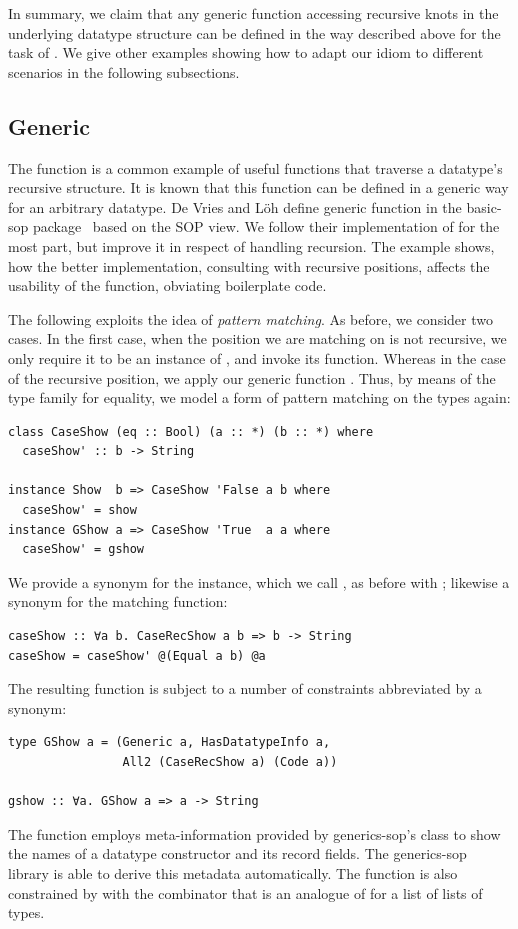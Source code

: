 \documentclass[sigplan,screen,review,anonymous]{acmart}
\begin{document}
In summary, we claim that any generic function accessing recursive knots in the underlying datatype structure can be defined in the way described above for the task of . We give other examples showing how to adapt our idiom to different scenarios in the following subsections.

\subsection{Generic }
\label{subsec:gshow}

The function  is a common example of useful functions that traverse a datatype's recursive structure. It is known that this function can be defined in a generic way for an arbitrary datatype. De Vries and L\"{o}h define generic function  in the \textsf{basic-sop} package~\cite{basic-sop} based on the SOP view. We follow their implementation of  for the most part, but improve it in respect of handling recursion. The example shows, how the better implementation, consulting with recursive positions, affects the usability of the function, obviating boilerplate code.

The following exploits the idea of \emph{pattern matching}. As before, we consider two cases. In the first case, when the position we are matching on is not recursive, we only require it to be an  instance of , and invoke its  function. Whereas in the case of the recursive position, we apply our generic function . Thus, by means of the type family for equality, we model a form of pattern matching on the types again:
\begin{lstlisting}[style=fancy]
class CaseShow (eq :: Bool) (a :: *) (b :: *) where
  caseShow' :: b -> String

instance Show  b => CaseShow 'False a b where
  caseShow' = show
instance GShow a => CaseShow 'True  a a where
  caseShow' = gshow
\end{lstlisting}
We provide a synonym for the  instance, which we call , as before with ; likewise a synonym for the matching function:
\begin{lstlisting}[style=fancy]
caseShow :: ∀a b. CaseRecShow a b => b -> String
caseShow = caseShow' @(Equal a b) @a
\end{lstlisting}

The resulting function  is subject to a number of constraints abbreviated by a  synonym:
\begin{lstlisting}[style=fancy]
type GShow a = (Generic a, HasDatatypeInfo a,
                All2 (CaseRecShow a) (Code a))

gshow :: ∀a. GShow a => a -> String
\end{lstlisting}
The function  employs meta-information provided by \textsf{generics-sop}'s class  to show the names of a datatype constructor and its record fields. The \textsf{generics-sop} library is able to derive this metadata automatically.
The function is also constrained by  with the  combinator that is an analogue of  for a list of lists of types. 
\end{document}
